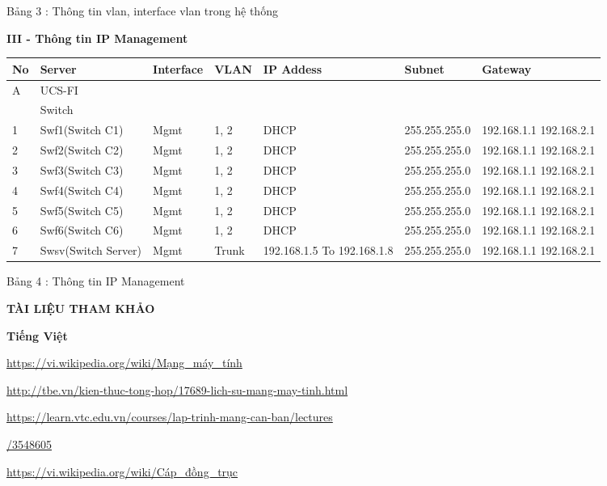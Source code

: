 \documentclass{report}
\begin{document}
\smallskip
\centerline{Bảng 3 : Thông tin vlan, interface vlan trong hệ thống}

\changefontsizes{14pt}
\newpage
\textbf{III - Thông tin IP Management}
\smallskip

\changefontsizes{12pt}
\begin{tabular}{|m{0.5cm}|m{3.6cm}|m{1.5cm}|m{1.1cm}|m{1.9cm}|m{2.3cm}|m{1.85cm}|}
	\hline
	No & Server & Interface & VLAN & IP Addess & Subnet & Gateway \\
    \hline
     A & UCS-FI & & & & &  \\
	\hline
	& Switch & & & & & \\
	\hline 
    1 & Swf1(Switch C1) & Mgmt & 1, 2 & DHCP & 255.255.255.0 & 192.168.1.1 192.168.2.1 \\
	\hline
	2 & Swf2(Switch C2) & Mgmt & 1, 2 & DHCP & 255.255.255.0 & 192.168.1.1 192.168.2.1 \\
	\hline	
	3 & Swf3(Switch C3) & Mgmt & 1, 2 & DHCP & 255.255.255.0 & 192.168.1.1 192.168.2.1 \\
	\hline	
	4 & Swf4(Switch C4) & Mgmt & 1, 2 & DHCP & 255.255.255.0 & 192.168.1.1 192.168.2.1 \\ 
	\hline	
	5 & Swf5(Switch C5) & Mgmt & 1, 2 & DHCP & 255.255.255.0 & 192.168.1.1 192.168.2.1 \\
	\hline	
	6 & Swf6(Switch C6) & Mgmt & 1, 2 & DHCP & 255.255.255.0 & 192.168.1.1 192.168.2.1 \\
	\hline	
	7 & Swsv(Switch Server) & Mgmt & Trunk & 192.168.1.5 To 192.168.1.8 & 255.255.255.0 & 192.168.1.1 192.168.2.1 \\
	\hline	
\end{tabular}


\smallskip
\centerline{Bảng 4 : Thông tin IP Management}


\newpage
\changefontsizes{16pt}
\centerline{\textbf{TÀI LIỆU THAM KHẢO}}

\vspace{1.2cm}
\changefontsizes{14pt}
\textbf{Tiếng Việt}

\changefontsizes{13pt}
\bigskip
\url{https://vi.wikipedia.org/wiki/Mạng_máy_tính}

\smallskip
\url{http://tbe.vn/kien-thuc-tong-hop/17689-lich-su-mang-may-tinh.html}

\smallskip
\url{https://learn.vtc.edu.vn/courses/lap-trinh-mang-can-ban/lectures}

\url{/3548605}

\smallskip
\url{https://vi.wikipedia.org/wiki/Cáp_đồng_trục}
\end{document}

